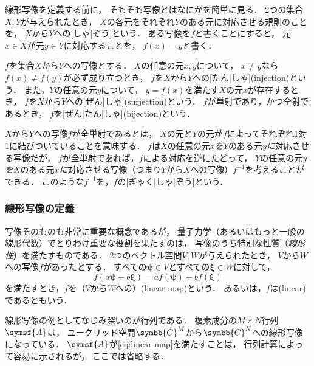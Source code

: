 \documentclass[
]{sotsu}
\newcommand{\bpsi}{\symbf{\psi}}
\newcommand{\bxi}{\symbf{\xi}}
\newcommand{\fire}[1]{\textcolor{fire}{#1}}
\newcommand{\water}[1]{\textcolor{water}{#1}}
\begin{document}
\quad
線形写像を定義する前に，
そもそも写像とはなにかを簡単に見る．
2つの集合$X, Y$が与えられたとき，
$X$の各元をそれぞれ$Y$のある元に対応させる規則のことを，
$X$から$Y$への[しゃ|ぞう]という．
ある写像を$f$と書くことにすると，
元$x \in X$が元$y \in Y$に対応することを，
$f(x) = y$と書く．

$f$を集合$X$から$Y$への写像とする．
$X$の任意の元$x, y$について，
$x \neq y$なら$f(x) \neq f(y)$が必ず成り立つとき，
$f$を$X$から$Y$への[たん|しゃ](injection)という．
また，$Y$の任意の元$y$について，
$y = f(x)$を満たす$X$の元$x$が存在するとき，
$f$を$X$から$Y$への[ぜん|しゃ](surjection)という．
$f$が単射であり，かつ全射であるとき，
$f$を[ぜん|たん|しゃ](bijection)という．

$X$から$Y$への写像$f$が全単射であるとは，
$X$の元と$Y$の元が$f$によってそれぞれ1対1に結びついていることを意味する．
$f$は\fire{$X$の任意の元$x$\emph{を}}\water{$Y$のある元$y$\emph{に}}対応させる写像だが，
$f$が全単射であれば，$f$による対応を逆にたどって，
\water{$Y$の任意の元$y$\emph{を}}\fire{$X$のある元$x$\emph{に}}対応させる写像（つまり$Y$から$X$への写像）$f^{-1}$を考えることができる．
このような$f^{-1}$を，$f$の[ぎゃく|しゃ|ぞう]という．


\subsubsection{線形写像の定義}

写像そのものも非常に重要な概念であるが，
量子力学（あるいはもっと一般の線形代数）でとりわけ重要な役割を果たすのは，
写像のうち特別な性質（\emph{線形性}）を満たすものである．
2つのベクトル空間$V, W$が与えられたとき，
$V$から$W$への写像$f$があったとする．
すべての$\bpsi \in V$とすべての$\bxi \in W$に対して，
\begin{equation}
    \label{eq:linear-map}
    f(a \bpsi + b \bxi)
        = a f(\bpsi) + b f(\bxi)
\end{equation}
を満たすとき，$f$を（$V$から$W$への）(linear map)という．
あるいは，$f$は(linear)であるともいう．

線形写像の例としてなじみ深いのが行列である．
複素成分の$M \times N$行列$\symsf{A}$は，
ユークリッド空間$\symbb{C}^M$から$\symbb{C}^N$への線形写像になっている．
$\symsf{A}$が\cref{eq:linear-map}を満たすことは，
行列計算によって容易に示されるが，
ここでは省略する．
\end{document}
